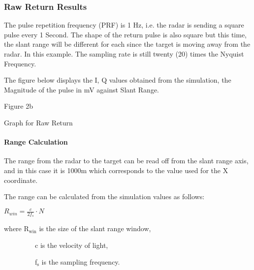 \documentclass{sebase}
\begin{document}
\subsubsection{Raw Return Results}

\smallskip

\smallskip The pulse repetition frequency (PRF) is 1 Hz, i.e. the radar is
sending a square pulse every 1 Second. The shape of the return pulse is also
square but this time, the slant range will be different for each since the
target is moving away from the radar. In this example. The sampling rate is
still twenty (20) times the Nyquist Frequency.

\smallskip

The figure below displays the I, Q values obtained from the simulation, the
Magnitude of the pulse in mV against Slant Range.

\smallskip

\smallskip Figure 2b

\smallskip

Graph for Raw Return

\smallskip

\smallskip

\smallskip

\smallskip

\smallskip

\smallskip

\smallskip

\smallskip

\smallskip

\paragraph{\protect\smallskip Range Calculation}

\smallskip

The range from the radar to the target can be read off from the slant range
axis, and in this case it is 1000m which corresponds to the value used for
the X coordinate.\smallskip

\smallskip The range can be calculated from the simulation values as follows:

$R_{win}=\frac{c}{2f_{s}}\cdot N$

where R$_{\text{win}}$ is the size of the slant range window,

\ \ \ \ \ \ \ \ \ c is the velocity of light,

\ \ \ \ \ \ \ \ \ f$_{\text{s}}$ is the sampling frequency.
\end{document}
